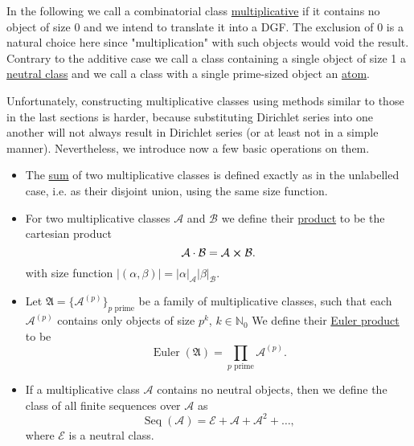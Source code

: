 In the following we call a combinatorial class \ul{multiplicative} if it contains no object of size 0 and we intend to translate it into a DGF. 
The exclusion of 0 is a natural choice here since "multiplication" with such objects would void the result. 
Contrary to the additive case we call a class containing a single object of size 1 a \ul{neutral class} and we call a class with a single prime-sized object an \ul{atom}.

Unfortunately, constructing multiplicative classes using methods similar to those in the last sections is harder, because substituting Dirichlet series into one another will not always result in Dirichlet series (or at least not in a simple manner).
Nevertheless, we introduce now a few basic operations on them.
\begin{itemize}
    \item The \ul{sum} of two multiplicative classes is defined exactly as in the unlabelled case, i.e. as their disjoint union, using the same size function.

    \item For two multiplicative classes $\mathcal{A}$ and $\mathcal{B}$ we define their \ul{product} to be the cartesian product
    \begin{equation*}
        \mathcal{A} \cdot \mathcal{B} = \mathcal{A} \cross \mathcal{B}.
    \end{equation*}
    with size function $|(\alpha, \beta)| = |\alpha|_{\mathcal{A}} |\beta|_\mathcal{B}$.
    
    \item Let $\mathfrak{A} = \{\mathcal{A}^{(p)}\}_{p \text{ prime}}$ be a family of multiplicative classes, such that each $\mathcal{A}^{(p)}$ contains only objects of size $p^k$, $k \in \mathbb{N}_0$
    We define their \ul{Euler product} to be
    \begin{equation*}
        \operatorname{Euler}(\mathfrak{A}) = \prod_{p \text{ prime}} \mathcal{A}^{(p)}.
    \end{equation*}
    
    \item If a multiplicative class $\mathcal{A}$ contains no neutral objects, then we define the class of all finite sequences over $\mathcal{A}$ as
    \begin{equation*}
        \operatorname{Seq}(\mathcal{A}) = \mathcal{E} + \mathcal{A} + \mathcal{A}^2 + \dots,
    \end{equation*}
    where $\mathcal{E}$ is a neutral class.
\end{itemize}

